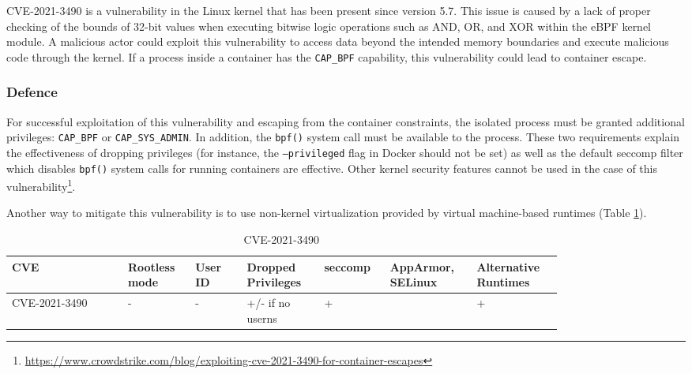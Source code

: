 CVE-2021-3490 is a vulnerability in the Linux kernel that has been present since version 5.7. This issue is caused by a lack of proper checking of the bounds of 32-bit values when executing bitwise logic operations such as AND, OR, and XOR within the eBPF kernel module. A malicious actor could exploit this vulnerability to access data beyond the intended memory boundaries and execute malicious code through the kernel. If a process inside a container has the \texttt{CAP\_BPF} capability, this vulnerability could lead to container escape.


\subsubsection*{Defence}

For successful exploitation of this vulnerability and escaping from the container constraints, the isolated process must be granted additional privileges: \texttt{CAP\_BPF} or \linebreak \texttt{CAP\_SYS\_ADMIN}. In addition, the \texttt{bpf()} system call must be available to the process. These two requirements explain the effectiveness of dropping privileges (for instance, the \linebreak \texttt{--privileged} flag in Docker should not be set) as well as the default seccomp filter which disables \texttt{bpf()} system calls for running containers are effective. Other kernel security features cannot be used in the case of this vulnerability\footnote{\url{https://www.crowdstrike.com/blog/exploiting-cve-2021-3490-for-container-escapes}}.

Another way to mitigate this vulnerability is to use non-kernel virtualization provided by virtual machine-based runtimes (Table \ref{tab:h:4}).


\begin{table}[H]
    \centering \small
    \begin{tabular}{| p{0.18\linewidth} | p{0.1\linewidth} | p{0.08\linewidth} | p{0.12\linewidth} | p{0.09\linewidth} | p{0.12\linewidth} | p{0.12\linewidth} |} \hline
    CVE & Rootless mode & User ID & Dropped Privileges & seccomp & AppArmor, SELinux & Alternative Runtimes \\ \hline
    CVE-2021-3490 & - & - & \cellcolor{yellow!25} +/- \linebreak if no userns & \cellcolor{green!25} + &  & \cellcolor{green!25} + \\ \hline
    \end{tabular}
    \caption{CVE-2021-3490}
    \label{tab:h:4}
\end{table}



